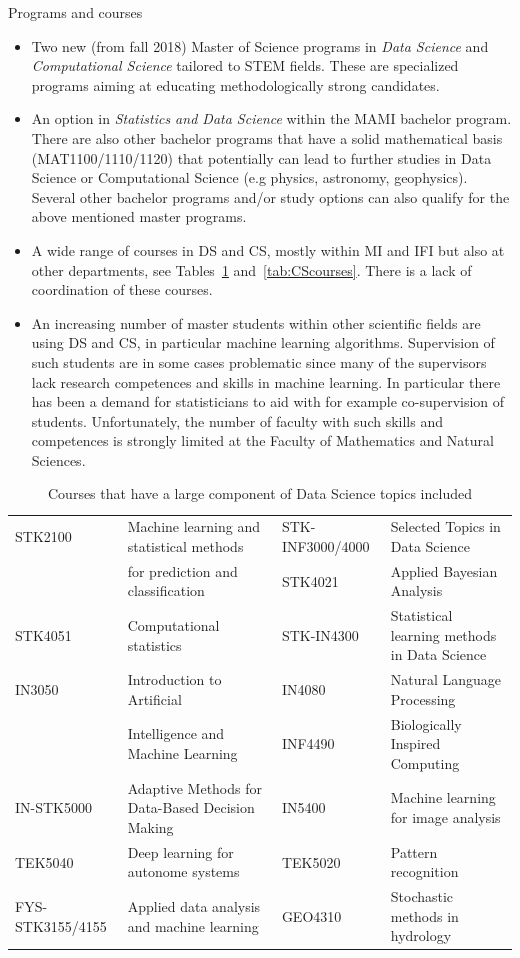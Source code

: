 \documentclass[a4paper,10pt]{article}
\begin{document}
Programs and courses
\begin{itemize}
\item Two new (from fall 2018) Master of Science programs in \emph{Data Science} and \emph{Computational Science} tailored to STEM fields. These are specialized programs aiming at educating methodologically strong candidates.
\item An option in \emph{Statistics and Data Science} within the MAMI bachelor program. There are also other bachelor programs that have a solid mathematical basis (MAT1100/1110/1120) that potentially can lead to further studies in Data Science or Computational Science (e.g physics, astronomy, geophysics). 
Several other  bachelor programs and/or study options can also qualify for the above mentioned master programs.
\item A wide range of courses in DS and CS, mostly within MI and IFI but also at other departments, see Tables~\ref{tab:DScourses} and~\ref{tab:CScourses}.
There is a lack of coordination of these courses.
\item An increasing number of master students within other scientific fields are using DS and CS, in particular machine learning algorithms. Supervision of such students are in some cases problematic since many of the supervisors lack research competences and skills in machine learning. In particular there has been a demand for statisticians to aid with for example co-supervision of students. Unfortunately, the number of faculty with such skills and competences is strongly limited at the Faculty of Mathematics and Natural Sciences.
\end{itemize}
\begin{table}[t]
    \centering
\caption{Courses that have a large component of Data Science topics included}
\label{tab:DScourses}
    \tiny
    \begin{tabular}{llll}
    \hline
STK2100 & Machine learning and statistical methods&
STK-INF3000/4000 & Selected Topics in Data Science\\
&for prediction and classification&STK4021 &Applied Bayesian Analysis\\
STK4051 & Computational statistics&
STK-IN4300 & Statistical learning methods in Data Science\\
IN3050 & Introduction to Artificial&
IN4080 & Natural Language Processing\\
& Intelligence and Machine Learning&INF4490 & Biologically Inspired Computing\\
IN-STK5000 & Adaptive Methods for Data-Based Decision Making&
IN5400 & Machine learning for image analysis\\
TEK5040 & Deep learning for autonome systems&
TEK5020 & Pattern recognition\\
FYS-STK3155/4155 & Applied data analysis and machine learning&
GEO4310 &Stochastic methods in hydrology\\
\hline
\end{tabular}

\end{table}
\end{document}

